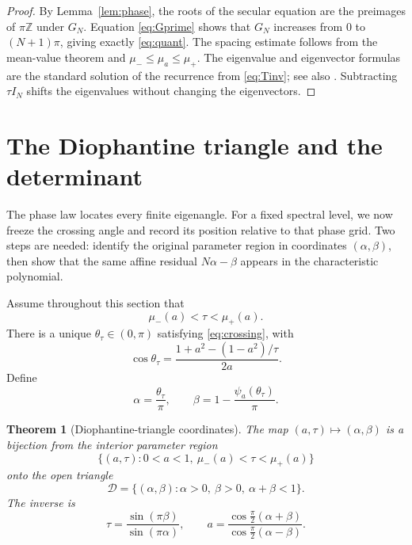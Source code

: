 \documentclass[11pt,reqno]{amsart}
\theoremstyle{plain}
\newtheorem{theorem}{Theorem}
\theoremstyle{definition}
\begin{document}
\begin{proof}
By Lemma~\ref{lem:phase}, the roots of the secular equation are the preimages of
$\pi\mathbb Z$ under $G_N$.  Equation \eqref{eq:Gprime} shows that $G_N$
increases from $0$ to $(N+1)\pi$, giving exactly \eqref{eq:quant}.  The spacing
estimate follows from the mean-value theorem and
$\mu_-\le\mu_a\le\mu_+$.  The eigenvalue and eigenvector formulas are the
standard solution of the recurrence from \eqref{eq:Tinv}; see also
\cite{Fikioris2018,BBGM2015,BBGM2016}.  Subtracting $\tau I_N$ shifts the
eigenvalues without changing the eigenvectors.
\end{proof}

\section{The Diophantine triangle and the determinant}\label{sec:triangle}

The phase law locates every finite eigenangle.  For a fixed spectral level, we now
freeze the crossing angle and record its position relative to that phase grid.  Two
steps are needed: identify the original parameter region in coordinates
$(\alpha,\beta)$, then show that the same affine residual $N\alpha-\beta$ appears in
the characteristic polynomial.

Assume throughout this section that
\begin{equation}\label{eq:interior}
\mu_-(a)<\tau<\mu_+(a).
\end{equation}
There is a unique $\theta_\tau\in(0,\pi)$ satisfying \eqref{eq:crossing}, with
\begin{equation}\label{eq:costheta}
\cos\theta_\tau
=\frac{1+a^2-(1-a^2)/\tau}{2a}.
\end{equation}
Define
\begin{equation}\label{eq:alphabeta}
\alpha=\frac{\theta_\tau}{\pi},
\qquad
\beta=1-\frac{\psi_a(\theta_\tau)}{\pi}.
\end{equation}

\begin{theorem}[Diophantine-triangle coordinates]\label{thm:triangle}
The map $(a,\tau)\mapsto(\alpha,\beta)$ is a bijection from the interior parameter
region
\[
\{(a,\tau):0<a<1,\ \mu_-(a)<\tau<\mu_+(a)\}
\]
onto the open triangle
\begin{equation}\label{eq:triangle}
\mathcal D=\{(\alpha,\beta):\alpha>0,\ \beta>0,\ \alpha+\beta<1\}.
\end{equation}
The inverse is
\begin{equation}\label{eq:inverse}
\boxed{
\tau=\frac{\sin(\pi\beta)}{\sin(\pi\alpha)},
\qquad
 a=\frac{\cos\frac\pi2(\alpha+\beta)}
         {\cos\frac\pi2(\alpha-\beta)}.}
\end{equation}
\end{theorem}
\end{document}
